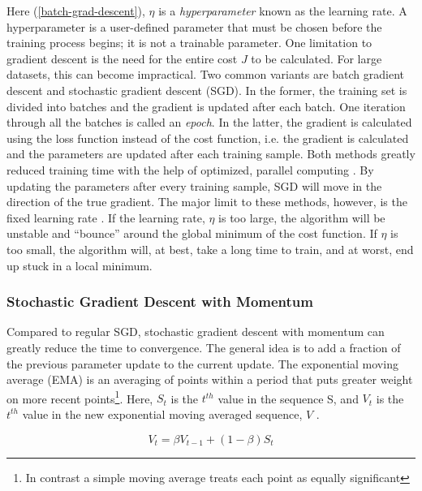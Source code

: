 \noindent Here (\ref{batch-grad-descent}), $ \eta $ is a \textit{hyperparameter} known as the learning rate. A hyperparameter is a user-defined parameter that must be chosen before the training process begins; it is not a trainable parameter. One limitation to gradient descent is the need for the entire cost $ J $ to be calculated. For large datasets, this can become impractical. Two common variants are batch gradient descent and stochastic gradient descent (SGD). In the former, the training set is divided into batches and the gradient is updated after each batch. One iteration through all the batches is called an \textit{epoch}. In the latter, the gradient is calculated using the loss function instead of the cost function, i.e. the gradient is calculated and the parameters are updated after each training sample. Both methods greatly reduced training time with the help of optimized, parallel computing \cite{stoch-grad-desc-parallel}. By updating the parameters after every training sample, SGD will move in the direction of the true gradient. The major limit to these methods, however, is the fixed learning rate \cite{grad-desc-limits}. If the learning rate, $ \eta $ is too large, the algorithm will be unstable and ``bounce'' around the global minimum of the cost function. If $ \eta $ is too small, the algorithm will, at best, take a long time to train, and at worst, end up stuck in a local minimum. 

\subsubsection{Stochastic Gradient Descent with Momentum}
Compared to regular SGD, stochastic gradient descent with momentum \cite{grad-desc-with-mom-orig} can greatly reduce the time to convergence. The general idea is to add a fraction of the previous parameter update to the current update. The exponential moving average (EMA) is an averaging of points within a period that puts greater weight on more recent points\footnote{In contrast a simple moving average treats each point as equally significant}. Here, $ S_t $ is the $ t^{th} $  value in the sequence S, and $ V_t $ is the $ t^{th} $  value in the new exponential moving averaged sequence, $ V $ .

\begin{equation}
    \label{eq:SGD-w-momentum}
    V_t = \beta V_{t-1} + (1 - \beta)S_t
\end{equation}

